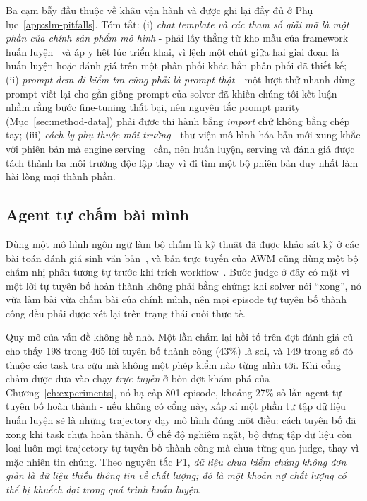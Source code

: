 Ba cạm bẫy đầu thuộc về khâu vận hành và được ghi lại đầy đủ ở
Phụ lục~\ref{app:slm-pitfalls}. Tóm tắt: (i) \emph{chat template và các tham số
giải mã là một phần của chính sản phẩm mô hình} - phải lấy thẳng từ kho mẫu
của framework huấn luyện~\cite{zheng2024llamafactory} và áp y hệt lúc triển
khai, vì lệch một chút giữa hai giai đoạn là huấn luyện hoặc đánh giá trên một
phân phối khác hẳn phân phối đã thiết kế; (ii) \emph{prompt đem đi kiểm tra
cũng phải là prompt thật} - một lượt thử nhanh dùng prompt viết lại cho gần
giống prompt của solver đã khiến chúng tôi kết luận nhầm rằng bước fine-tuning
thất bại, nên nguyên tắc prompt parity (Mục~\ref{sec:method-data}) phải được
thi hành bằng \emph{import} chứ không bằng chép tay; (iii) \emph{cách ly phụ
thuộc môi trường} - thư viện mô hình hóa bản mới xung khắc với phiên bản mà
engine serving~\cite{kwon2023vllm} cần, nên huấn luyện, serving và đánh giá
được tách thành ba môi trường độc lập thay vì đi tìm một bộ phiên bản duy nhất
làm hài lòng mọi thành phần.

\subsection{Agent tự chấm bài mình}

Dùng một mô hình ngôn ngữ làm bộ chấm là kỹ thuật đã được khảo sát kỹ ở các bài
toán đánh giá sinh văn bản~\cite{zheng2023judge}, và bản trực tuyến của AWM
cũng dùng một bộ chấm nhị phân tương tự trước khi trích
workflow~\cite{wang2024awm}. Bước judge ở đây có mặt vì một lời tự tuyên bố
hoàn thành không phải bằng chứng: khi solver nói ``xong'', nó vừa làm bài vừa
chấm bài của chính mình, nên mọi episode tự tuyên bố thành công đều phải được
xét lại trên trạng thái cuối thực tế.

Quy mô của vấn đề không hề nhỏ. Một lần chấm lại hồi tố trên đợt đánh giá cũ
cho thấy 198 trong 465 lời tuyên bố thành công (43\%) là sai, và 149 trong số
đó thuộc các task tra cứu mà không một phép kiểm nào từng nhìn tới. Khi cổng
chấm được đưa vào chạy \emph{trực tuyến} ở bốn đợt khám phá của
Chương~\ref{ch:experiments}, nó hạ cấp 801 episode, khoảng 27\% số lần agent tự
tuyên bố hoàn thành - nếu không có cổng này, xấp xỉ một phần tư tập dữ liệu
huấn luyện sẽ là những trajectory dạy mô hình đúng một điều: cách tuyên bố đã
xong khi task chưa hoàn thành. Ở chế độ nghiêm ngặt, bộ dựng tập dữ liệu còn
loại luôn mọi trajectory tự tuyên bố thành công mà chưa từng qua judge, thay vì
mặc nhiên tin chúng. Theo nguyên tắc P1, \emph{dữ liệu chưa kiểm chứng không
đơn giản là dữ liệu thiếu thông tin về chất lượng; đó là một khoản nợ chất
lượng có thể bị khuếch đại trong quá trình huấn luyện}.


